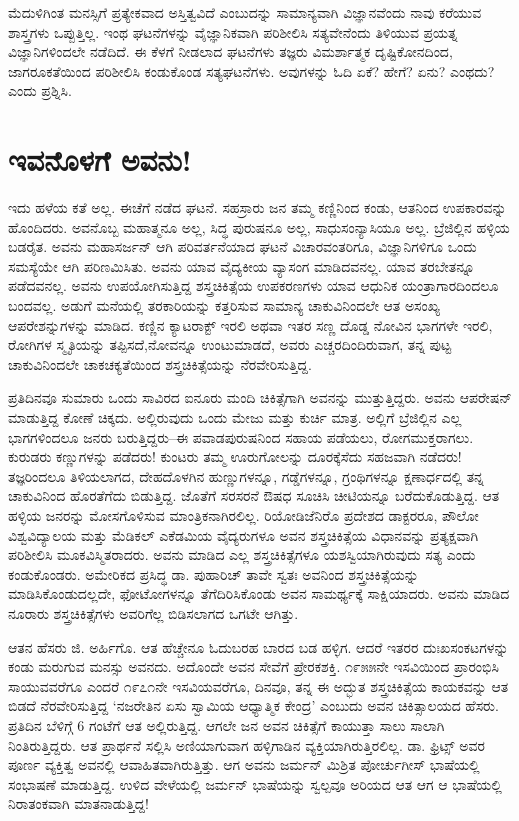 ಮೆದುಳಿಗಿಂತ ಮನಸ್ಸಿಗೆ ಪ್ರತ್ಯೇಕವಾದ ಅಸ್ತಿತ್ವವಿದೆ ಎಂಬುದನ್ನು ಸಾಮಾನ್ಯವಾಗಿ ವಿಜ್ಞಾನವೆಂದು ನಾವು ಕರೆಯುವ ಶಾಸ್ತ್ರಗಳು ಒಪ್ಪುತ್ತಿಲ್ಲ. ಇಂಥ ಘಟನೆಗಳನ್ನು ವೈಜ್ಞಾನಿಕವಾಗಿ ಪರಿಶೀಲಿಸಿ ಸತ್ಯವೇನೆಂದು ತಿಳಿಯುವ ಪ್ರಯತ್ನ ವಿಜ್ಞಾನಿಗಳಿಂದಲೇ ನಡೆದಿದೆ. ಈ ಕೆಳಗೆ ನೀಡಲಾದ ಘಟನೆಗಳು ತಜ್ಞರು ವಿಮರ್ಶಾತ್ಮಕ ದೃಷ್ಟಿಕೋನದಿಂದ, ಜಾಗರೂಕತೆಯಿಂದ ಪರಿಶೀಲಿಸಿ ಕಂಡುಕೊಂಡ ಸತ್ಯಘಟನೆಗಳು. ಅವುಗಳನ್ನು ಓದಿ ಏಕೆ? ಹೇಗೆ? ಏನು? ಎಂಥದು? ಎಂದು ಪ್ರಶ್ನಿಸಿ.


\section*{ಇವನೊಳಗೆ ಅವನು!}


ಇದು ಹಳೆಯ ಕತೆ ಅಲ್ಲ. ಈಚೆಗೆ ನಡೆದ ಘಟನೆ. ಸಹಸ್ರಾರು ಜನ ತಮ್ಮ ಕಣ್ಣಿನಿಂದ ಕಂಡು, ಆತನಿಂದ ಉಪಕಾರವನ್ನು ಹೊಂದಿದರು. ಅವನೊಬ್ಬ ಮಹಾತ್ಮನೂ ಅಲ್ಲ, ಸಿದ್ಧ ಪುರುಷನೂ ಅಲ್ಲ, ಸಾಧುಸಂನ್ಯಾಸಿಯೂ ಅಲ್ಲ. ಬ್ರೆಜಿಲ್ಲಿನ ಹಳ್ಳಿಯ ಬಡರೈತ. ಅವನು ಮಹಾಸರ್ಜನ್ ಆಗಿ ಪರಿವರ್ತನೆಯಾದ ಘಟನೆ ವಿಚಾರವಂತರಿಗೂ, ವಿಜ್ಞಾನಿಗಳಿಗೂ ಒಂದು ಸಮಸ್ಯೆಯೇ ಆಗಿ ಪರಿಣಮಿಸಿತು. ಅವನು ಯಾವ ವೈದ್ಯಕೀಯ ವ್ಯಾಸಂಗ ಮಾಡಿದವನಲ್ಲ. ಯಾವ ತರಬೇತನ್ನೂ ಪಡೆದವನಲ್ಲ. ಅವನು ಉಪಯೋಗಿಸುತ್ತಿದ್ದ ಶಸ್ತ್ರಚಿಕಿತ್ಸೆಯ ಉಪಕರಣಗಳು ಯಾವ ಆಧುನಿಕ ಯಂತ್ರಾಗಾರದಿಂದಲೂ ಬಂದವಲ್ಲ. ಅಡುಗೆ ಮನೆಯಲ್ಲಿ ತರಕಾರಿಯನ್ನು ಕತ್ತರಿಸುವ ಸಾಮಾನ್ಯ ಚಾಕುವಿನಿಂದಲೇ ಆತ ಅಸಂಖ್ಯ ಆಪರೇಶನ್ನುಗಳನ್ನು ಮಾಡಿದ. ಕಣ್ಣಿನ ಕ್ಯಾಟರಾಕ್ಟ್ ಇರಲಿ ಅಥವಾ ಇತರ ಸಣ್ಣ ದೊಡ್ಡ ನೋವಿನ ಭಾಗಗಳೇ ಇರಲಿ, ರೋಗಿಗಳ ಸ್ಮೃತಿಯನ್ನು ತಪ್ಪಿಸದೆ,\break ನೋವನ್ನೂ ಉಂಟುಮಾಡದೆ, ಅವರು ಎಚ್ಚರದಿಂದಿರುವಾಗ, ತನ್ನ ಪುಟ್ಟ ಚಾಕುವಿನಿಂದಲೇ ಚಾಕಚಕ್ಯತೆಯಿಂದ ಶಸ್ತ್ರಚಿಕಿತ್ಸೆಯನ್ನು ನೆರವೇರಿಸುತ್ತಿದ್ದ.

ಪ್ರತಿದಿನವೂ ಸುಮಾರು ಒಂದು ಸಾವಿರದ ಐನೂರು ಮಂದಿ ಚಿಕಿತ್ಸೆಗಾಗಿ ಅವನನ್ನು ಮುತ್ತು\-ತ್ತಿದ್ದರು. ಅವನು ಆಪರೇಷನ್ ಮಾಡುತ್ತಿದ್ದ ಕೋಣೆ ಚಿಕ್ಕದು. ಅಲ್ಲಿರುವುದು ಒಂದು ಮೇಜು ಮತ್ತು ಕುರ್ಚಿ ಮಾತ್ರ. ಅಲ್ಲಿಗೆ ಬ್ರೆಜಿಲ್ಲಿನ ಎಲ್ಲ ಭಾಗಗಳಿಂದಲೂ ಜನರು ಬರುತ್ತಿದ್ದರು–ಈ ಪವಾಡಪುರುಷನಿಂದ ಸಹಾಯ ಪಡೆಯಲು, ರೋಗಮುಕ್ತರಾಗಲು. ಕುರುಡರು ಕಣ್ಣುಗಳನ್ನು ಪಡೆದರು! ಕುಂಟರು ತಮ್ಮ ಊರುಗೋಲನ್ನು ದೂರಕ್ಕೆಸೆದು ಸಹಜವಾಗಿ ನಡೆದರು! ತಜ್ಞರಿಂದಲೂ ತಿಳಿಯಲಾಗದ, ದೇಹದೊಳಗಿನ ಹುಣ್ಣುಗಳನ್ನೂ, ಗಡ್ಡೆಗಳನ್ನೂ, ಗ್ರಂಥಿಗಳನ್ನೂ ಕ್ಷಣಾರ್ಧದಲ್ಲಿ ತನ್ನ ಚಾಕುವಿನಿಂದ ಹೊರತೆಗೆದು ಬಿಡುತ್ತಿದ್ದ. ಜೊತೆಗೆ ಸರಸರನೆ ಔಷಧ ಸೂಚಿಸಿ ಚೀಟಿಯನ್ನೂ ಬರೆದುಕೊಡುತ್ತಿದ್ದ. ಆತ ಹಳ್ಳಿಯ ಜನರನ್ನು ಮೋಸಗೊಳಿಸುವ ಮಾಂತ್ರಿಕನಾಗಿರಲಿಲ್ಲ. ರಿಯೋಡಿಜೆನಿರೊ ಪ್ರದೇಶದ ಡಾಕ್ಟರರೂ, ಪೌಲೋ ವಿಶ್ವವಿದ್ಯಾಲಯ ಮತ್ತು ಮೆಡಿಕಲ್ ಎಕೆಡಮಿಯ ವೈದ್ಯರುಗಳೂ ಅವನ ಶಸ್ತ್ರಚಿಕಿತ್ಸೆಯ ವಿಧಾನವನ್ನು ಪ್ರತ್ಯಕ್ಷವಾಗಿ ಪರಿಶೀಲಿಸಿ ಮೂಕವಿಸ್ಮಿತರಾದರು. ಅವನು ಮಾಡಿದ ಎಲ್ಲ ಶಸ್ತ್ರಚಿಕಿತ್ಸೆಗಳೂ ಯಶಸ್ವಿಯಾಗಿರುವುದು ಸತ್ಯ ಎಂದು ಕಂಡುಕೊಂಡರು. ಅಮೇರಿಕದ ಪ್ರಸಿದ್ಧ ಡಾ. ಪುಹಾರಿಚ್ ತಾವೇ ಸ್ವತಃ ಅವನಿಂದ ಶಸ್ತ್ರಚಿಕಿತ್ಸೆಯನ್ನು ಮಾಡಿಸಿಕೊಂಡುದಲ್ಲದೇ, ಫೋಟೋಗಳನ್ನೂ ತೆಗೆದಿರಿಸಿಕೊಂಡು ಅವನ ಸಾಮರ್ಥ್ಯಕ್ಕೆ ಸಾಕ್ಷಿಯಾದರು. ಅವನು ಮಾಡಿದ ನೂರಾರು ಶಸ್ತ್ರಚಿಕಿತ್ಸೆಗಳು ಅವರಿಗೆಲ್ಲ ಬಿಡಿಸ\-ಲಾಗದ ಒಗಟೇ ಆಗಿತ್ತು.

ಆತನ ಹೆಸರು ಜಿ. ಅರ್ಹಿಗೊ. ಆತ ಹೆಚ್ಚೇನೂ ಓದುಬರಹ ಬಾರದ ಬಡ ಹಳ್ಳಿಗ. ಆದರೆ ಇತರರ ದುಃಖಸಂಕಟಗಳನ್ನು ಕಂಡು ಮರುಗುವ ಮನಸ್ಸು ಅವನದು. ಅದೊಂದೇ ಅವನ ಸೇವೆಗೆ ಪ್ರೇರಕಶಕ್ತಿ. ೧೯೫೫ನೇ ಇಸವಿಯಿಂದ ಪ್ರಾರಂಭಿಸಿ ಸಾಯುವವರೆಗೂ ಎಂದರೆ ೧೯೭೧ನೇ ಇಸವಿಯವರೆಗೂ, ದಿನವೂ, ತನ್ನ ಈ ಅದ್ಭುತ ಶಸ್ತ್ರಚಿಕಿತ್ಸೆಯ ಕಾಯಕವನ್ನು ಆತ ಬಿಡದೆ ನೆರವೇರಿಸುತ್ತಿದ್ದ ‘ನಜರೇತಿನ ಏಸು ಸ್ವಾಮಿಯ ಆಧ್ಯಾತ್ಮಿಕ ಕೇಂದ್ರ’ ಎಂಬುದು ಅವನ ಚಿಕಿತ್ಸಾಲಯದ ಹೆಸರು. ಪ್ರತಿದಿನ ಬೆಳಿಗ್ಗೆ 6 ಗಂಟೆಗೆ ಆತ ಅಲ್ಲಿರುತ್ತಿದ್ದ. ಆಗಲೇ ಜನ ಅವನ ಚಿಕಿತ್ಸೆಗೆ ಕಾಯುತ್ತಾ ಸಾಲು ಸಾಲಾಗಿ ನಿಂತಿರುತ್ತಿದ್ದರು. ಆತ ಪ್ರಾರ್ಥನೆ ಸಲ್ಲಿಸಿ ಅಣಿಯಾಗುವಾಗ ಹಳ್ಳಿಗಾಡಿನ ವ್ಯಕ್ತಿಯಾಗಿರುತ್ತಿರಲಿಲ್ಲ. ಡಾ. ಫ್ರಿಟ್ಸ್ ಅವರ ಪೂರ್ಣ ವ್ಯಕ್ತಿತ್ವ ಅವನಲ್ಲಿ ಆವಾಹಿತವಾಗಿರುತ್ತಿತ್ತು. ಆಗ ಅವನು ಜರ್ಮನ್ ಮಿಶ್ರಿತ ಪೋರ್ಚುಗೀಸ್ ಭಾಷೆಯಲ್ಲಿ ಸಂಭಾಷಣೆ ಮಾಡುತ್ತಿದ್ದ. ಉಳಿದ ವೇಳೆಯಲ್ಲಿ ಜರ್ಮನ್ ಭಾಷೆಯನ್ನು ಸ್ವಲ್ಪವೂ ಅರಿಯದ ಆತ ಆಗ ಆ ಭಾಷೆಯಲ್ಲಿ ನಿರಾತಂಕವಾಗಿ ಮಾತನಾಡುತ್ತಿದ್ದ!

